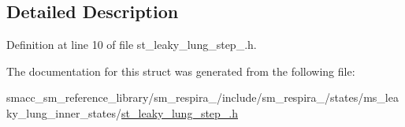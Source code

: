 \subsection{Detailed Description}


Definition at line 10 of file st\+\_\+leaky\+\_\+lung\+\_\+step\+\_.\+h.



The documentation for this struct was generated from the following file\+:\begin{DoxyCompactItemize}
\item 
smacc\+\_\+sm\+\_\+reference\+\_\+library/sm\+\_\+respira\+\_/include/sm\+\_\+respira\+\_/states/ms\+\_\+leaky\+\_\+lung\+\_\+inner\+\_\+states/\hyperlink{st__leaky__lung__step__1_8h}{st\+\_\+leaky\+\_\+lung\+\_\+step\+\_.\+h}\end{DoxyCompactItemize}
